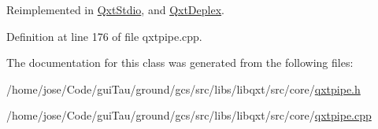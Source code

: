 Reimplemented in \hyperlink{class_qxt_stdio_a4eb0284bd569ece883b96bb53adbc3ba}{Qxt\-Stdio}, and \hyperlink{class_qxt_deplex_a9d5bdbaab0b92fca1dbc3280ee5a9f4a}{Qxt\-Deplex}.



Definition at line 176 of file qxtpipe.\-cpp.



The documentation for this class was generated from the following files\-:\begin{DoxyCompactItemize}
\item 
/home/jose/\-Code/gui\-Tau/ground/gcs/src/libs/libqxt/src/core/\hyperlink{qxtpipe_8h}{qxtpipe.\-h}\item 
/home/jose/\-Code/gui\-Tau/ground/gcs/src/libs/libqxt/src/core/\hyperlink{qxtpipe_8cpp}{qxtpipe.\-cpp}\end{DoxyCompactItemize}
